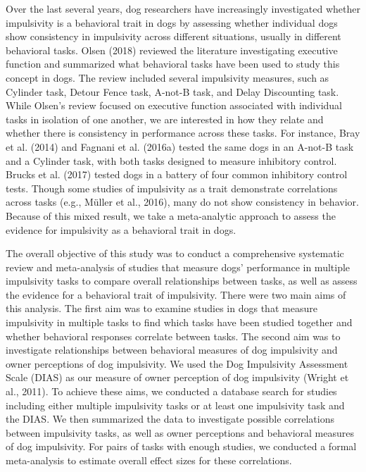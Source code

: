 \documentclass[
  ,pub,floatsintext]{apa6}
\begin{document}
Over the last several years, dog researchers have increasingly investigated whether impulsivity is a behavioral trait in dogs by assessing whether individual dogs show consistency in impulsivity across different situations, usually in different behavioral tasks. Olsen (2018) reviewed the literature investigating executive function and summarized what behavioral tasks have been used to study this concept in dogs. The review included several impulsivity measures, such as Cylinder task, Detour Fence task, A-not-B task, and Delay Discounting task. While Olsen's review focused on executive function associated with individual tasks in isolation of one another, we are interested in how they relate and whether there is consistency in performance across these tasks. For instance, Bray et al. (2014) and Fagnani et al. (2016a) tested the same dogs in an A-not-B task and a Cylinder task, with both tasks designed to measure inhibitory control. Brucks et al. (2017) tested dogs in a battery of four common inhibitory control tests. Though some studies of impulsivity as a trait demonstrate correlations across tasks (e.g., Müller et al., 2016), many do not show consistency in behavior. Because of this mixed result, we take a meta-analytic approach to assess the evidence for impulsivity as a behavioral trait in dogs.

The overall objective of this study was to conduct a comprehensive systematic review and meta-analysis of studies that measure dogs' performance in multiple impulsivity tasks to compare overall relationships between tasks, as well as assess the evidence for a behavioral trait of impulsivity. There were two main aims of this analysis. The first aim was to examine studies in dogs that measure impulsivity in multiple tasks to find which tasks have been studied together and whether behavioral responses correlate between tasks. The second aim was to investigate relationships between behavioral measures of dog impulsivity and owner perceptions of dog impulsivity. We used the Dog Impulsivity Assessment Scale (DIAS) as our measure of owner perception of dog impulsivity (Wright et al., 2011). To achieve these aims, we conducted a database search for studies including either multiple impulsivity tasks or at least one impulsivity task and the DIAS. We then summarized the data to investigate possible correlations between impulsivity tasks, as well as owner perceptions and behavioral measures of dog impulsivity. For pairs of tasks with enough studies, we conducted a formal meta-analysis to estimate overall effect sizes for these correlations.
\end{document}
